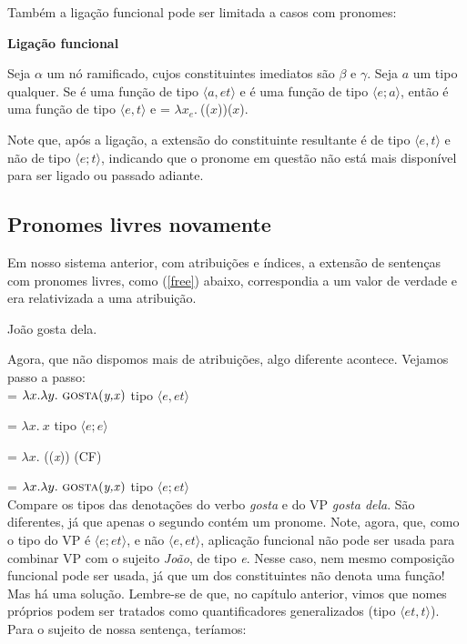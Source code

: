 Também a ligação funcional pode ser limitada a casos com pronomes:\\

\begin{tcolorbox}[boxrule=0pt,sharp corners]

\noindent \textbf{Ligação funcional}

\n Seja $\alpha$ um nó ramificado, cujos constituintes imediatos
são $\beta$ e $\gamma$. Seja $a$ um tipo qualquer. Se \den{$\beta$} é uma função de
tipo $\langle a,et \rangle$ e \den{$\gamma$} é uma função de
tipo $\langle e;a \rangle$, então
\den{$\alpha$} é uma função de tipo $\langle e,t \rangle$ e \den{$\alpha$} = $\lambda x_{e}.\ $\den{$\beta$}(\den{$\gamma$}($x$))($x$).

\end{tcolorbox}

\bigskip

\n Note que, após a ligação, a extensão do constituinte resultante é de tipo $\langle e,t \rangle$ e não de tipo $\langle e;t \rangle$, indicando que o pronome em questão não está mais disponível para ser ligado ou passado adiante.

		
\subsection{Pronomes livres novamente}

Em nosso sistema anterior, com atribuições e índices, a extensão de sentenças com pronomes livres, como (\ref{free}) abaixo, correspondia a um valor de verdade e era relativizada a uma atribuição.

\begin{exe}
	\ex João gosta dela. \label{free}
\end{exe}

\n Agora, que não dispomos mais de atribuições, algo diferente acontece. Vejamos passo a passo:\\

\n {} = $\lambda x. \lambda y.\ \predica{gosta}{y,x}$ \hfill tipo $\langle e,et \rangle$

\n {} = $\lambda x.\ x$ \hfill tipo $\langle e;e \rangle$

\n {} = $\lambda x.$ ((\textit{x})) \hfill (CF)

\n {} = $\lambda x. \lambda y.\ \predica{gosta}{y,x}$ \hfill tipo $\langle e;et \rangle$\\

\n Compare os tipos das denotações do verbo \textit{gosta} e do VP \textit{gosta dela}. São diferentes, já que apenas o segundo contém um pronome. Note, agora, que, como o tipo do VP é $\langle e;et \rangle$, e não $\langle e,et \rangle$, aplicação funcional não pode ser usada para combinar VP com o sujeito \textit{João}, de tipo \textit{e}. Nesse caso, nem mesmo composição funcional pode ser usada, já que um dos constituintes não denota uma função! Mas há uma solução. Lembre-se de que, no capítulo anterior, vimos que nomes próprios podem ser tratados como quantificadores generalizados (tipo $\langle et,t \rangle$). Para o sujeito de nossa sentença, teríamos:\\

